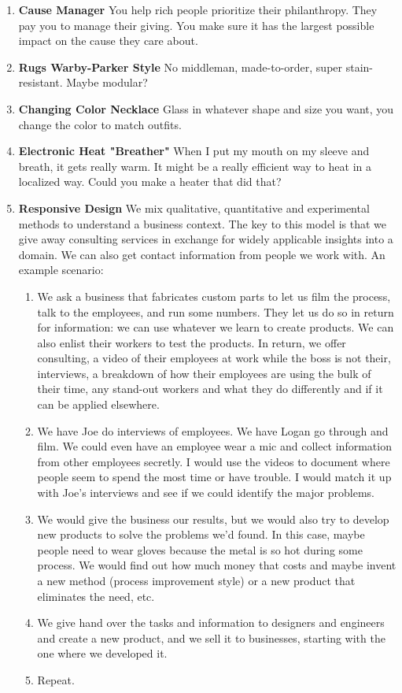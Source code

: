\documentclass[paper=a4, fontsize=11pt]{scrartcl} %
\numberwithin{equation}{section} %
\numberwithin{figure}{section} %
\numberwithin{table}{section} %
\begin{document}
\begin{enumerate}
\item \textbf{Cause Manager} You help rich people prioritize their philanthropy.  They pay you to manage their giving.  You make sure it has the largest possible impact on the cause they care about.

\item \textbf{Rugs Warby-Parker Style} No middleman, made-to-order, super stain-resistant.  Maybe modular?

\item \textbf{Changing Color Necklace}  Glass in whatever shape and size you want, you change the color to match outfits.  

\item \textbf{Electronic Heat "Breather"} When I put my mouth on my sleeve and breath, it gets really warm.  It might be a really efficient way to heat in a localized way.  Could you make a heater that did that?

\item \textbf{Responsive Design}  We mix qualitative, quantitative and experimental methods to understand a business context.  The key to this model is that we give away consulting services in exchange for widely applicable insights into a domain.  We can also get contact information from people we work with.  An example scenario:
\begin{enumerate}
\item We ask a business that fabricates custom parts to let us film the process, talk to the employees, and run some numbers.  They let us do so in return for information: we can use whatever we learn to create products.  We can also enlist their workers to test the products.  In return, we offer consulting, a video of their employees at work while the boss is not their, interviews, a breakdown of how their employees are using the bulk of their time, any stand-out workers and what they do differently and if it can be applied elsewhere.
\item We have Joe do interviews of employees.  We have Logan go through and film.  We could even have an employee wear a mic and collect information from other employees secretly.  I would use the videos to document where people seem to spend the most time or have trouble.  I would match it up with Joe's interviews and see if we could identify the major problems.
\item We would give the business our results, but we would also try to develop new products to solve the problems we'd found.  In this case, maybe people need to wear gloves because the metal is so hot during some process.  We would find out how much money that costs and maybe invent a new method (process improvement style) or a new product that eliminates the need, etc.
\item We give hand over the tasks and information to designers and engineers and create a new product, and we sell it to businesses, starting with the one where we developed it.
\item Repeat.
\end{enumerate}


\end{enumerate}
\end{document}
